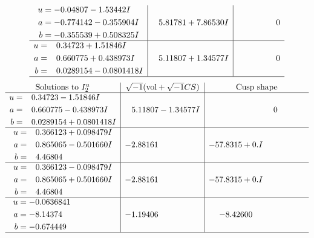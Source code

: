 \documentclass[1p]{elsarticle_modified}
\theoremstyle{definition}
\newcommand{\I}{\sqrt{-1}}
\begin{document}
$$\begin{array}{c|c|c}
\begin{aligned}
u &= -0.04807 - 1.53442 I \\
a &= -0.774142 - 0.355904 I \\
b &= -0.355539 + 0.508325 I\end{aligned}
 & \phantom{-}5.81781 + 7.86530 I & \phantom{-0.000000 } 0 \\ \hline\begin{aligned}
u &= \phantom{-}0.34723 + 1.51846 I \\
a &= \phantom{-}0.660775 + 0.438973 I \\
b &= \phantom{-}0.0289154 - 0.0801418 I\end{aligned}
 & \phantom{-}5.11807 + 1.34577 I & \phantom{-0.000000 } 0\\
 \hline 
 \end{array}$$\newpage$$\begin{array}{c|c|c}  
\text{Solutions to }I^u_{2}& \I (\text{vol} + \sqrt{-1}CS) & \text{Cusp shape}\\
 \hline 
\begin{aligned}
u &= \phantom{-}0.34723 - 1.51846 I \\
a &= \phantom{-}0.660775 - 0.438973 I \\
b &= \phantom{-}0.0289154 + 0.0801418 I\end{aligned}
 & \phantom{-}5.11807 - 1.34577 I & \phantom{-0.000000 } 0 \\ \hline\begin{aligned}
u &= \phantom{-}0.366123 + 0.098479 I \\
a &= \phantom{-}0.865065 - 0.501660 I \\
b &= \phantom{-}4.46804\phantom{ +0.000000I}\end{aligned}
 & -2.88161\phantom{ +0.000000I} & -57.8315 + 0. I\phantom{ +0.000000I} \\ \hline\begin{aligned}
u &= \phantom{-}0.366123 - 0.098479 I \\
a &= \phantom{-}0.865065 + 0.501660 I \\
b &= \phantom{-}4.46804\phantom{ +0.000000I}\end{aligned}
 & -2.88161\phantom{ +0.000000I} & -57.8315 + 0. I\phantom{ +0.000000I} \\ \hline\begin{aligned}
u &= -0.0636841\phantom{ +0.000000I} \\
a &= -8.14374\phantom{ +0.000000I} \\
b &= -0.674449\phantom{ +0.000000I}\end{aligned}
 & -1.19406\phantom{ +0.000000I} & -8.42600\phantom{ +0.000000I}\\
 \hline 
 \end{array}$$\newpage\newpage\renewcommand{\arraystretch}{1}
\end{document}
